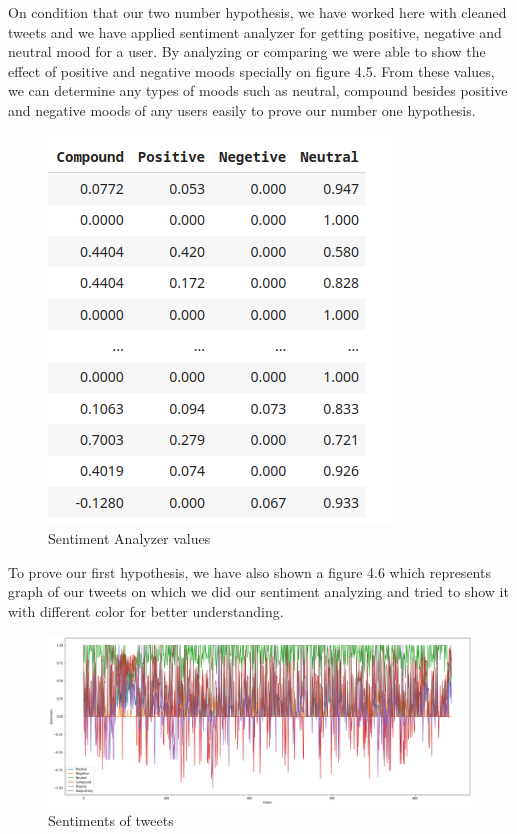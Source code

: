 On condition that our two number hypothesis, we have worked here with cleaned tweets and we have applied sentiment analyzer for getting positive, negative and neutral mood for a user. By analyzing or comparing we were able to show the effect of positive and negative moods specially on figure 4.5. From these values, we can determine any types of moods such as neutral, compound besides positive and negative moods of any users easily to prove our number one hypothesis.\\
\begin{figure}[H]
    \centering
    \includegraphics[scale=.9]{img4/analyzer.png}
    \caption{Sentiment Analyzer values}
    \label{fig:analyzer}
\end{figure}

To prove our first hypothesis, we have also shown a figure 4.6 which represents graph of our tweets on which we did our sentiment analyzing and tried to show it with different color for better understanding.\\
\begin{figure}[H]
    \centering
    \includegraphics[scale=.3]{img4/sentiment.png}
    \caption{Sentiments of tweets}
    \label{fig:Sentiments of tweets}
\end{figure}



